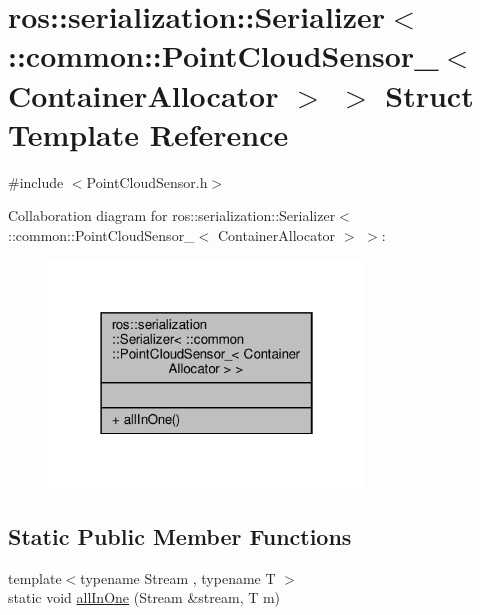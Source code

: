 \hypertarget{structros_1_1serialization_1_1Serializer_3_01_1_1common_1_1PointCloudSensor___3_01ContainerAllocator_01_4_01_4}{}\section{ros\+:\+:serialization\+:\+:Serializer$<$ \+:\+:common\+:\+:Point\+Cloud\+Sensor\+\_\+$<$ Container\+Allocator $>$ $>$ Struct Template Reference}
\label{structros_1_1serialization_1_1Serializer_3_01_1_1common_1_1PointCloudSensor___3_01ContainerAllocator_01_4_01_4}


{\ttfamily \#include $<$Point\+Cloud\+Sensor.\+h$>$}



Collaboration diagram for ros\+:\+:serialization\+:\+:Serializer$<$ \+:\+:common\+:\+:Point\+Cloud\+Sensor\+\_\+$<$ Container\+Allocator $>$ $>$\+:\nopagebreak
\begin{figure}[H]
\begin{center}
\leavevmode
\includegraphics[width=238pt]{d3/d8b/structros_1_1serialization_1_1Serializer_3_01_1_1common_1_1PointCloudSensor___3_01ContainerAllocator_01_4_01_4__coll__graph}
\end{center}
\end{figure}
\subsection*{Static Public Member Functions}
\begin{DoxyCompactItemize}
\item 
{\footnotesize template$<$typename Stream , typename T $>$ }\\static void \hyperlink{structros_1_1serialization_1_1Serializer_3_01_1_1common_1_1PointCloudSensor___3_01ContainerAllocator_01_4_01_4_a06d2fbcc6527f514d2bc53b414710c7b}{all\+In\+One} (Stream \&stream, T m)
\end{DoxyCompactItemize}


